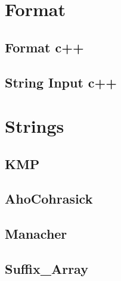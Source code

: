 \documentclass[12pt]{extarticle}
\author{
  Ankesh Gupta, Ronak Agarwal, Anant Chhajwani  
}
\begin{document}
\maketitle
\begin{multicols*}{2}
\setlength{\parskip}{0.0in}
\tableofcontents
\setlength{\parskip}{0.1in}
\section{Format}

\subsection{Format c++} %

\subsection{String Input c++} %


% 



\section{Strings}

\subsection{KMP} %


\subsection{AhoCohrasick} %


\subsection{Manacher}


\subsection{Suffix\_Array} %



\end{multicols*}
\end{document}
